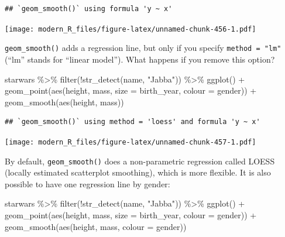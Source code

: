 \documentclass[
]{article}
\newenvironment{Shaded}{\begin{snugshade}}{\end{snugshade}}
\newcommand{\AttributeTok}[1]{\textcolor[rgb]{0.77,0.63,0.00}{#1}}
\newcommand{\FunctionTok}[1]{\textcolor[rgb]{0.00,0.00,0.00}{#1}}
\newcommand{\NormalTok}[1]{#1}
\newcommand{\SpecialCharTok}[1]{\textcolor[rgb]{0.00,0.00,0.00}{#1}}
\newcommand{\StringTok}[1]{\textcolor[rgb]{0.31,0.60,0.02}{#1}}
\begin{document}
\begin{verbatim}
## `geom_smooth()` using formula 'y ~ x'
\end{verbatim}

\texttt{[image: modern\_R\_files/figure-latex/unnamed-chunk-456-1.pdf]}

\texttt{geom\_smooth()} adds a regression line, but only if you specify \texttt{method\ =\ "lm"} (``lm'' stands for
``linear model''). What happens if you remove this option?

\begin{Shaded}
\begin{Highlighting}[]
\NormalTok{starwars }\SpecialCharTok{\%\textgreater{}\%}
  \FunctionTok{filter}\NormalTok{(}\SpecialCharTok{!}\FunctionTok{str\_detect}\NormalTok{(name, }\StringTok{"Jabba"}\NormalTok{)) }\SpecialCharTok{\%\textgreater{}\%}
  \FunctionTok{ggplot}\NormalTok{() }\SpecialCharTok{+}
    \FunctionTok{geom\_point}\NormalTok{(}\FunctionTok{aes}\NormalTok{(height, mass, }\AttributeTok{size =}\NormalTok{ birth\_year, }\AttributeTok{colour =}\NormalTok{ gender)) }\SpecialCharTok{+}
    \FunctionTok{geom\_smooth}\NormalTok{(}\FunctionTok{aes}\NormalTok{(height, mass))}
\end{Highlighting}
\end{Shaded}

\begin{verbatim}
## `geom_smooth()` using method = 'loess' and formula 'y ~ x'
\end{verbatim}

\texttt{[image: modern\_R\_files/figure-latex/unnamed-chunk-457-1.pdf]}

By default, \texttt{geom\_smooth()} does a non-parametric regression called LOESS (locally estimated scatterplot smoothing),
which is more flexible. It is also possible to have one regression line by gender:

\begin{Shaded}
\begin{Highlighting}[]
\NormalTok{starwars }\SpecialCharTok{\%\textgreater{}\%}
  \FunctionTok{filter}\NormalTok{(}\SpecialCharTok{!}\FunctionTok{str\_detect}\NormalTok{(name, }\StringTok{"Jabba"}\NormalTok{)) }\SpecialCharTok{\%\textgreater{}\%}
  \FunctionTok{ggplot}\NormalTok{() }\SpecialCharTok{+}
    \FunctionTok{geom\_point}\NormalTok{(}\FunctionTok{aes}\NormalTok{(height, mass, }\AttributeTok{size =}\NormalTok{ birth\_year, }\AttributeTok{colour =}\NormalTok{ gender)) }\SpecialCharTok{+}
    \FunctionTok{geom\_smooth}\NormalTok{(}\FunctionTok{aes}\NormalTok{(height, mass, }\AttributeTok{colour =}\NormalTok{ gender))}
\end{Highlighting}
\end{Shaded}
\end{document}

